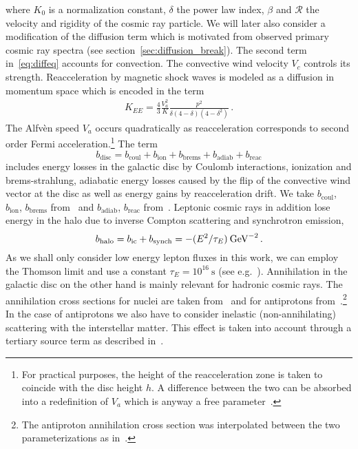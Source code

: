 \documentclass[a4paper,11pt]{article}
\newcommand{\eVdist}{\kern-0.06em}
\newcommand{\gev}{\:\text{Ge\eVdist V}}
\newcommand{\s}{\:\text{s}}
\begin{document}
where $K_0$ is a normalization constant, $\delta$ the power law index, $\beta$ and $\mathcal{R}$ the velocity and rigidity of the cosmic ray particle. We will later also consider a modification of the diffusion term which is motivated from observed primary cosmic ray spectra (see section~\ref{sec:diffusion_break}). 
The second term in~\eqref{eq:diffeq} accounts for convection. The convective wind velocity $V_c$ controls its strength. Reacceleration by magnetic shock waves is modeled as a diffusion in momentum space which is encoded in the term~\cite{Maurin:2002ua}
\begin{align}
K_{EE}=\frac{4}{3}\frac{V_a^2}{K}\frac{p^2}{\delta(4-\delta)(4-\delta^2)}\,.
\end{align}
The Alfv\`en speed $V_a$ occurs quadratically as reacceleration corresponds to second order Fermi acceleration.\footnote{For practical purposes, the height of the reacceleration zone is taken to coincide with the disc height $h$. A difference between the two can be absorbed into a redefinition of $V_a$ which is anyway a free parameter~\cite{Maurin:2001sj}.} The term
\begin{equation}
 b_{\text{disc}}= b_{\text{coul}} + b_{\text{ion}} + b_{\text{brems}} + b_{\text{adiab}}  + b_{\text{reac}}
\end{equation}
includes energy losses in the galactic disc by Coulomb interactions, ionization and brems-strahlung, adiabatic energy losses caused by the flip of the convective wind vector at the disc as well as energy gains by reacceleration drift. We take $b_{\text{coul}}$, $b_{\text{ion}}$, $b_{\text{brems}}$ from~\cite{Strong:1998pw} and $b_{\text{adiab}}$, $b_{\text{reac}}$ from~\cite{Maurin:2002ua}. Leptonic cosmic rays in addition lose energy in the halo due to inverse Compton scattering and synchrotron emission,
\begin{equation}\label{eq:halolosses}
 b_{\text{halo}}= b_{\text{ic}} + b_{\text{synch}}= -(E^2/\tau_E)\gev^{-2}\,.
\end{equation}
As we shall only consider low energy lepton fluxes in this work, we can employ the Thomson limit and use a constant $\tau_E=10^{16}\s$ (see e.g.~\cite{Delahaye:2008ua}).
Annihilation in the galactic disc on the other hand is mainly relevant for hadronic cosmic rays. The annihilation cross sections for nuclei are taken from~\cite{Tripathi:1999nw,Tripathi:1999} and for antiprotons from~\cite{Protheroe:1981gj,Tan:1983de}.\footnote{The antiproton annihilation cross section was interpolated between the two parameterizations as in~\cite{Kappl:2011jw}.} In the case of antiprotons we also have to consider inelastic (non-annihilating) scattering with the interstellar matter. This effect is taken into account through a tertiary source term as described in~\cite{Donato:2001ms}.
\end{document}
